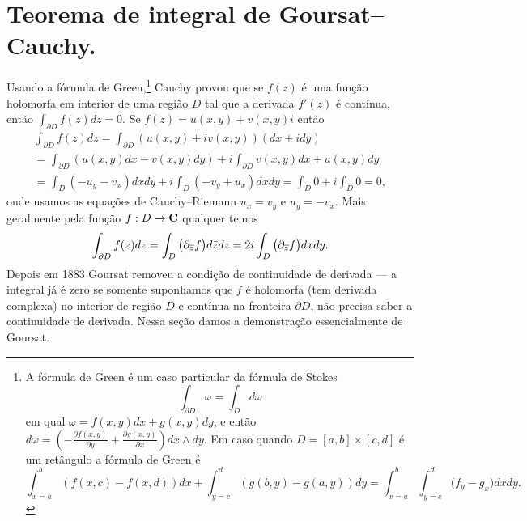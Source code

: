 \section{Teorema de integral de Goursat--Cauchy.}

\begin{remark}
Usando a fórmula de Green,\footnote{
A fórmula de Green 
é um caso particular da fórmula de Stokes 
$$\int_{\partial D} \omega = \int_D d\omega$$
em qual $\omega = f(x,y) dx + g(x,y) dy$, e então
$d\omega = (-\frac{\partial f(x,y)}{\partial y} + \frac{\partial g(x,y)}{\partial x}) dx\wedge dy$.
Em caso quando $D = [a,b] \times [c,d]$ é um retângulo a fórmula de Green é
\[ \int_{x=a}^b (f(x,c)-f(x,d)) dx + \int_{y=c}^d (g(b,y)-g(a,y)) dy
 = \int_{x=a}^b \int_{y=c}^d \big(f_y - g_x) dx dy . \]
}
Cauchy provou que se $f(z)$ é uma função holomorfa em interior de uma região $D$
tal que a derivada $f'(z)$ é contínua, então $\int_{\partial D} f(z) dz = 0$.
Se $f(z) = u(x,y) + v(x,y) i$ então
\begin{multline*}
\int_{\partial D} f(z) dz = \int_{\partial D} (u(x,y) + i v(x,y)) (dx + i dy) \\
= \int_{\partial D} (u(x,y) dx - v(x,y) dy) + i \int_{\partial D} v(x,y) dx + u(x,y) dy \\
= \int_D (-u_y-v_x) dx dy + i \int_D (-v_y + u_x) dx dy = \int_D 0 + i \int_D 0 = 0,
\end{multline*}
onde usamos as equações de Cauchy--Riemann $u_x = v_y$ e $u_y = - v_x$.
Mais geralmente pela função $f : D \to \mathbf{C}$ qualquer temos
\[ \int_{\partial D} f(z) dz =  \int_D \big(\partial_{\overline{z}} f\big) d\bar{z} dz
= 2i \int_D \big(\partial_{\overline{z}} f\big) dx dy. \]
Depois em 1883 Goursat removeu a condição de continuidade de derivada ---
a integral já é zero se somente suponhamos que $f$ é holomorfa
(tem derivada complexa) no interior de região $D$ e contínua na fronteira $\partial D$,
não precisa saber a continuidade de derivada.
Nessa seção damos a demonstração essencialmente de Goursat.
\end{remark}

